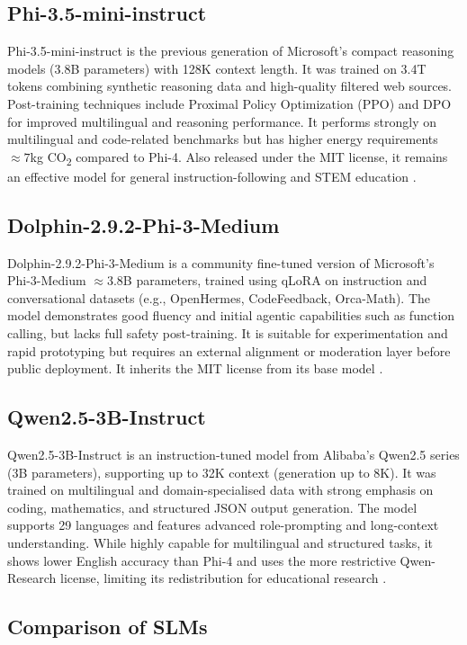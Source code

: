 \subsection{Phi-3.5-mini-instruct}
Phi-3.5-mini-instruct is the previous generation of Microsoft’s compact reasoning models (3.8B parameters) with 128K context length. It was trained on 3.4T tokens combining synthetic reasoning data and high-quality filtered web sources. Post-training techniques include Proximal Policy Optimization (PPO) and DPO for improved multilingual and reasoning performance. It performs strongly on multilingual and code-related benchmarks but has higher energy requirements \(\approx 7\)kg CO\textsubscript{2} compared to Phi-4. Also released under the MIT license, it remains an effective model for general instruction-following and STEM education \parencite{microsof85:online}.

\subsection{Dolphin-2.9.2-Phi-3-Medium}
Dolphin-2.9.2-Phi-3-Medium is a community fine-tuned version of Microsoft’s Phi-3-Medium \(\approx 3.8\)B parameters, trained using qLoRA on instruction and conversational datasets (e.g., OpenHermes, CodeFeedback, Orca-Math). The model demonstrates good fluency and initial agentic capabilities such as function calling, but lacks full safety post-training. It is suitable for experimentation and rapid prototyping but requires an external alignment or moderation layer before public deployment. It inherits the MIT license from its base model \parencite{dphndolp16:online}.

\subsection{Qwen2.5-3B-Instruct}
Qwen2.5-3B-Instruct is an instruction-tuned model from Alibaba’s Qwen2.5 series (3B parameters), supporting up to 32K context (generation up to 8K). It was trained on multilingual and domain-specialised data with strong emphasis on coding, mathematics, and structured JSON output generation. The model supports 29 languages and features advanced role-prompting and long-context understanding. While highly capable for multilingual and structured tasks, it shows lower English accuracy than Phi-4 and uses the more restrictive Qwen-Research license, limiting its redistribution for educational research \parencite{QwenQwen78:online}.

\subsection{Comparison of SLMs}

